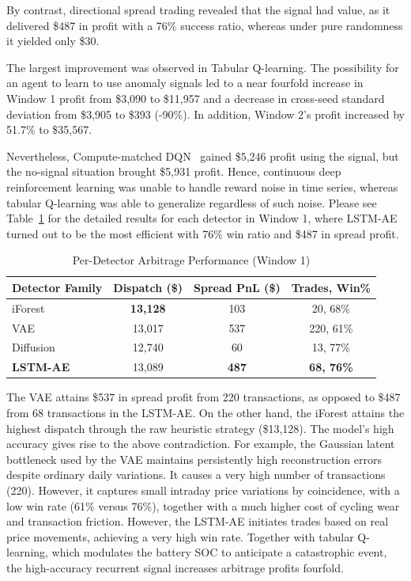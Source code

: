 \documentclass[journal]{IEEEtran}
\begin{document}
By contrast, directional spread trading revealed that the signal had value, as it delivered \$487 in profit with a 76\% success ratio, whereas under pure randomness it yielded only \$30.

The largest improvement was observed in Tabular Q-learning. The possibility for an agent to learn to use anomaly signals led to a near fourfold increase in Window 1 profit from \$3,090 to \$11,957 and a decrease in cross-seed standard deviation from \$3,905 to \$393 (-90\%). In addition, Window 2's profit increased by 51.7\% to \$35,567.

Nevertheless, Compute-matched DQN~\cite{Mnih_DQN} gained \$5,246 profit using the signal, but the no-signal situation brought \$5,931 profit. Hence, continuous deep reinforcement learning was unable to handle reward noise in time series, whereas tabular Q-learning was able to generalize regardless of such noise. Please see Table~\ref{tab:perdetector} for the detailed results for each detector in Window 1, where LSTM-AE turned out to be the most efficient with 76\% win ratio and \$487 in spread profit.

\begin{table}[!t]
\centering
\caption{Per-Detector Arbitrage Performance (Window 1)}
\label{tab:perdetector}
\footnotesize
\renewcommand{\arraystretch}{1.12}
\setlength{\tabcolsep}{2.5pt}
\begin{tabular*}{\columnwidth}{@{\extracolsep{\fill}}lccc@{}}
\toprule
\textbf{Detector Family} & \textbf{Dispatch (\$)} & \textbf{Spread PnL (\$)} & \textbf{Trades, Win\%} \\
\midrule
iForest & \textbf{13,128} & 103 & 20, 68\% \\
VAE & 13,017 & 537 & 220, 61\% \\
Diffusion & 12,740 & 60 & 13, 77\% \\
\textbf{LSTM-AE} & 13,089 & \textbf{487} & \textbf{68, 76\%} \\
\bottomrule
\end{tabular*}
\end{table}

The VAE attains \$537 in spread profit from 220 transactions, as opposed to \$487 from 68 transactions in the LSTM-AE. On the other hand, the iForest attains the highest dispatch through the raw heuristic strategy (\$13,128). The model's high accuracy gives rise to the above contradiction. For example, the Gaussian latent bottleneck used by the VAE maintains persistently high reconstruction errors despite ordinary daily variations. It causes a very high number of transactions (220). However, it captures small intraday price variations by coincidence, with a low win rate (61\% versus 76\%), together with a much higher cost of cycling wear and transaction friction. However, the LSTM-AE initiates trades based on real price movements, achieving a very high win rate. Together with tabular Q-learning, which modulates the battery SOC to anticipate a catastrophic event, the high-accuracy recurrent signal increases arbitrage profits fourfold.
\end{document}
